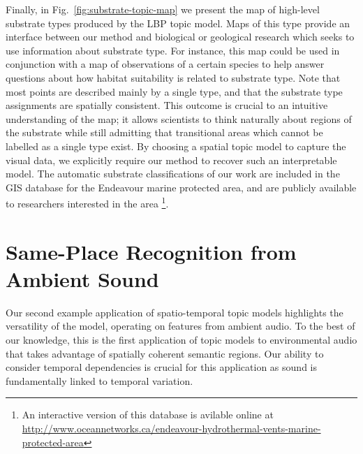 Finally, in Fig.~\ref{fig:substrate-topic-map} we present the map of high-level substrate types produced by the LBP topic model. Maps of this type provide an interface between our method and biological or geological research which seeks to use information about substrate type. For instance, this map could be used in conjunction with a map of observations of a certain species to help answer questions about how habitat suitability is related to substrate type. Note that most points are described mainly by a single type, and that the substrate type assignments are spatially consistent. This outcome is crucial to an intuitive understanding of the map; it allows scientists to think naturally about regions of the substrate while still admitting that transitional areas which cannot be labelled as a single type exist. By choosing a spatial topic model to capture the visual data, we explicitly require our method to recover such an interpretable model. The automatic substrate classifications of our work are included in the GIS database for the Endeavour marine protected area, and are publicly available to researchers interested in the area \citep{Douglas2017} \footnote{An interactive version of this database is avilable online at \url{http://www.oceannetworks.ca/endeavour-hydrothermal-vents-marine-protected-area}}.

\section{Same-Place Recognition from Ambient Sound} \label{sec:audio}

Our second example application of spatio-temporal topic models highlights the versatility of the model, operating on features from ambient audio. To the best of our knowledge, this is the first application of topic models to environmental audio that takes advantage of spatially coherent semantic regions. Our ability to consider temporal dependencies is crucial for this application as sound is fundamentally linked to temporal variation.

